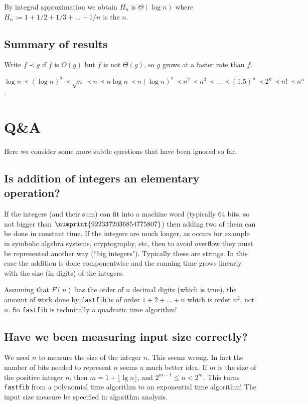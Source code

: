 \begin{Boxample} 
By integral approximation we obtain $H_n $ is $\Theta(\log n)$ where 
$H_n:=1+ 1/2 + 1/3 + \dots + 1/n$ is the $n$. 
\end{Boxample}

\section{Summary of results}
Write $f \prec g$ if $f$ is $O(g)$ but $f$ is not $\Theta(g)$, so $g$ grows at a  faster rate than $f$. 
\begin{Boxample}
$\log n \prec (\log n)^2 \prec \sqrt{n} \prec n \prec n \log n 
 \prec n (\log n)^2 \prec n^2 
\prec n^3 \prec \dots \prec (1.5)^n \prec 2^n \prec n! \prec n^n$.
\end{Boxample}


\chapter{Q\&A} %
Here we consider some more subtle questions that have been ignored so far.

\section{Is addition of integers an elementary operation?}
If the integers (and their sum) can fit into a machine word (typically 64 bits, 
so not bigger than $\numprint{9223372036854775807}$) then 
adding two of them can be done in constant time. 
If the integers are much longer, as occurs for example in symbolic algebra systems, cryptography, etc, 
then to avoid overflow they must be represented another way (``big integers"). Typically these are strings. 
In this case the addition is done componentwise and the running time grows linearly with the size (in digits) of the integers.

\begin{Boxample}
Assuming that $F(n)$ has the order of $n$ decimal digits (which is true), the amount of work 
done by \texttt{fastfib} is of order $1+2+\dots + n$ which is order $n^2$, not $n$. 
So \texttt{fastfib} is technically a quadratic time algorithm!
\end{Boxample}

\section{Have we been measuring input size correctly?}
We used $n$ to measure the size of the integer $n$. This seems wrong. 
In fact the number of bits needed to represent $n$ seems a much better idea. 
If $m$ is the size of the positive integer $n$, then $m = 1+\lfloor\lg n\rfloor$, and $2^{m-1} \leq n < 2^m$.
This turns \texttt{fastfib} from a polynomial time algorithm to an exponential time algorithm! 
The input size measure  be specified in algorithm analysis.


